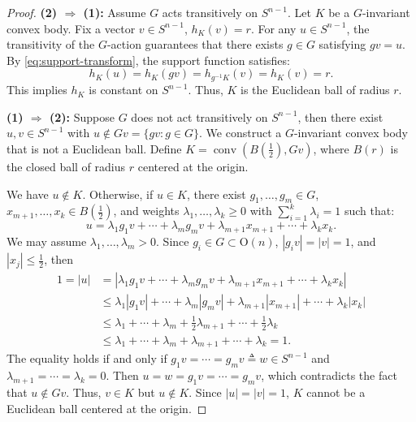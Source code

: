 \documentclass[12pt, reqno]{amsart}
\theoremstyle{definition}
\theoremstyle{remark}
\numberwithin{equation}{section}
\newcommand{\Sn}{S^{n-1}}
\newcommand{\On}{\mathrm{O}(n)}
\begin{document}
	\begin{proof}
		\medskip\noindent
		\textbf{(2) \(\Rightarrow\) (1):} 
		Assume \( G \) acts transitively on \( \Sn \). Let \( K \) be a \( G \)-invariant convex body. Fix a  vector $v \in S^{n-1}$, \( h_K(v)=r \). For any $u \in S^{n-1}$, 
		the transitivity of the $G$-action guarantees that there exists $g \in G$ 
		satisfying $gv = u$. By \eqref{eq:support-transform}, the support function  satisfies:
		\[
		h_K(u)=h_K(gv) =  h_{g^{-1}K}(v)=h_K(v)=r.
		\]
		This implies \( h_K \) is constant on \( \Sn \).  Thus, \( K \) is the Euclidean ball of radius \( r \).
		
		\medskip\noindent
		\textbf{(1) \(\Rightarrow\) (2):} 
		Suppose \( G \) does not act transitively on \( \Sn \), then there exist $u, v \in \Sn$ with $u \notin Gv=\{gv: g\in G\}$. 
		We construct a $G$-invariant convex body that is not a Euclidean ball.
		Define $K = \operatorname{conv}\left( B(\frac{1}{2}), Gv \right)$, 
		where $B(r)$ is the closed ball of radius $r$ centered at the origin.
		
		We have $u \notin K$. Otherwise, if \( u \in K \), there exist 
		\( g_1, \dots, g_m \in G \), 
		\( x_{m+1}, \dots, x_k \in B(\frac{1}{2}) \), 
		and weights \( \lambda_1, \dots, \lambda_k \geq 0 \) with \( \sum_{i=1}^k \lambda_i = 1 \) 
		such that:
		\[
		u = \lambda_1 g_1 v + \cdots + \lambda_m g_m v + \lambda_{m+1} x_{m+1} + \cdots + \lambda_k x_k.
		\]
		 We may assume \(\lambda_{1},\dots,\lambda_{m}>0\).  Since \(g_{i}\in G\subset \On\), \(|g_{i}v|=|v|=1\), and \(|x_{j}|\le \frac{1}{2}\), then
		\begin{align*}
			1=|u|&=|\lambda_{1}g_{1}v+\cdots+\lambda_{m}g_{m}v+\lambda_{m+1}x_{m+1}+\cdots+\lambda_{k}x_{k}|\\
			&\le \lambda_{1}|g_{1}v|+\cdots+\lambda_{m}|g_{m}v|+\lambda_{m+1}|x_{m+1}|+\cdots+\lambda_{k}|x_{k}|\\
			&\le \lambda_{1}+\cdots+\lambda_{m}+\frac{1}{2}\lambda_{m+1}+\cdots+\frac{1}{2}\lambda_{k}\\
			&\le\lambda_{1}+\cdots+\lambda_{m}+\lambda_{m+1}+\cdots+\lambda_{k}=1.
		\end{align*}
		The equality holds if and only if $g_1v =\cdots = g_mv\triangleq w\in \Sn$ and \(\lambda_{m+1}=\cdots=\lambda_{k}=0\). Then $u=w=g_1v =\cdots = g_mv$, which contradicts the fact that $u \notin Gv$. Thus, \(v\in K\) but \(u\notin K\). Since $|u|=|v|=1$, $K$ cannot be a Euclidean ball centered at the origin.
		

\end{proof}
\end{document}
